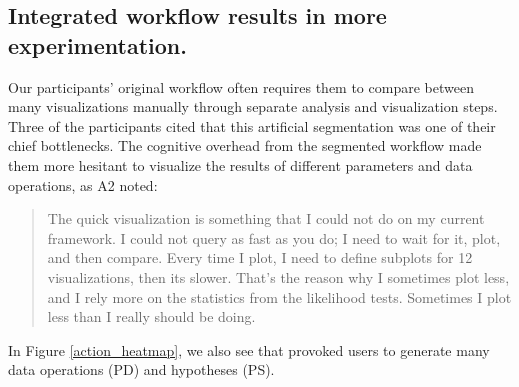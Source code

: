 \subsection{Integrated workflow results in more experimentation.}
\par Our participants' original workflow often requires them to compare between many visualizations manually through separate analysis and visualization steps.  Three of the participants cited that this artificial segmentation was one of their chief bottlenecks. The cognitive overhead from the segmented workflow made them more hesitant to visualize the results of different parameters and data operations, as A2 noted:
\begin{quote}
The quick visualization is something that I could not do on my current framework. I could not query as fast as you do; I need to wait for it, plot, and then compare. Every time I plot, I need to define subplots for 12 visualizations, then its slower. That's the reason why I sometimes plot less, and I rely more on the statistics from the likelihood tests. Sometimes I plot less than I really should be doing.
\end{quote}
In Figure \ref{action_heatmap}, we also see that \zv provoked users to generate many data operations (PD) and hypotheses (PS).
